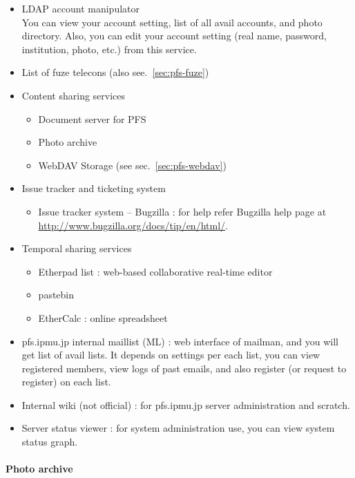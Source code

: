 \documentclass[a4paper,notitlepage]{article}
\begin{document}
\begin{itemize}
  \item LDAP account manipulator \\
    You can view your account setting, list of all avail accounts, and photo 
    directory. 
    Also, you can edit your account setting (real name, password, institution, 
    photo, etc.) from this service.
  \item List of fuze telecons (also see.~\ref{sec:pfs-fuze})
  \item Content sharing services
    \begin{itemize}
      \item Document server for PFS
      \item Photo archive
      \item WebDAV Storage (see sec.~\ref{sec:pfs-webdav})
    \end{itemize}
  \item Issue tracker and ticketing system
    \begin{itemize}
      \item Issue tracker system -- Bugzilla : 
        for help refer Bugzilla help page at 
        \url{http://www.bugzilla.org/docs/tip/en/html/}.
    \end{itemize}
  \item Temporal sharing services
    \begin{itemize}
      \item Etherpad list : web-based collaborative real-time editor
      \item pastebin
      \item EtherCalc : online spreadsheet
    \end{itemize}
  \item pfs.ipmu.jp internal maillist (ML) :
    web interface of mailman, and you will get list of avail lists. 
    It depends on settings per each list, you can view registered members, 
    view logs of past emails, and also register (or request to register) on 
    each list. 
  \item Internal wiki (not official) : 
    for pfs.ipmu.jp server administration and scratch. 
  \item Server status viewer : 
    for system administration use, you can view system status graph.
\end{itemize}

\paragraph{Photo archive}
\end{document}
